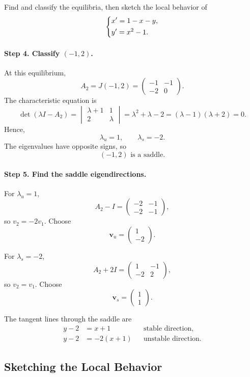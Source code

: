 \documentclass[10pt,letterpaper]{article}
\begin{document}
\begin{example}[1]{
Find and classify the equilibria, then sketch the
local behavior of
\[
\begin{dcases}
x'=1-x-y,\\
y'=x^2-1.
\end{dcases}
\]
}
\paragraph{Step 4. Classify $(-1,2)$.}
At this equilibrium,
\[
A_2=J(-1,2)=
\begin{pmatrix}
-1&-1\\
-2&0
\end{pmatrix}.
\]
The characteristic equation is
\[
\det(\lambda I-A_2)
=
\begin{vmatrix}
\lambda+1&1\\
2&\lambda
\end{vmatrix}
=\lambda^2+\lambda-2
=(\lambda-1)(\lambda+2)=0.
\]
Hence,
\[
\lambda_u=1,\qquad \lambda_s=-2.
\]
The eigenvalues have opposite signs, so
\[
\boxed{(-1,2)\text{ is a saddle}.}
\]

\paragraph{Step 5. Find the saddle eigendirections.}
For $\lambda_u=1$,
\[
A_2-I=
\begin{pmatrix}
-2&-1\\
-2&-1
\end{pmatrix},
\]
so $v_2=-2v_1$. Choose
\[
\mathbf{v}_u=
\begin{pmatrix}1\\-2\end{pmatrix}.
\]

For $\lambda_s=-2$,
\[
A_2+2I=
\begin{pmatrix}
1&-1\\
-2&2
\end{pmatrix},
\]
so $v_2=v_1$. Choose
\[
\mathbf{v}_s=
\begin{pmatrix}1\\1\end{pmatrix}.
\]

The tangent lines through the saddle are
\[
\begin{aligned}
y-2&=x+1
&&\text{stable direction},\\
y-2&=-2(x+1)
&&\text{unstable direction}.
\end{aligned}
\]
\end{example}

\subsection{Sketching the Local Behavior}
\end{document}

